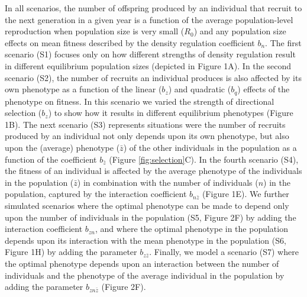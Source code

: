 \documentclass{article}
\begin{document}
 In all scenarios, the number of offspring produced by an individual that recruit to the next generation in a given year is a function of the average population-level reproduction when population size is very small ($R_0$) and any population size effects on mean fitness described by the density regulation coefficient $b_{n}$. The first scenario (S1) focuses only on how different strengths of density regulation result in different equilibrium population sizes (depicted in Figure 1A). In the second scenario (S2), the number of recruits an individual produces is also affected by its own phenotype as a function of the linear ($b_z$) and quadratic ($b_q$) effects of the phenotype on fitness. In this scenario we varied the strength of directional selection ($b_z$) to show how it results in different equilibrium phenotypes (Figure 1B). The next scenario (S3) represents situations were the number of recruits produced by an individual not only depends upon its own phenotype, but also upon the (average) phenotype ($\bar{z}$) of the other individuals in the population as a function of the coefficient $b_{\bar{z}}$ (Figure \ref{fig:selection}C). In the fourth scenario (S4), the fitness of an individual is affected by the average phenotype of the individuals in the population ($\bar{z}$) in combination with the number of individuals ($n$) in the population,  captured by the interaction coefficient $b_{n\bar{z}}$ (Figure 1E). We further simulated scenarios where the optimal phenotype can be made to depend only upon the number of individuals in the population (S5, Figure 2F) by adding the interaction coefficient $b_{zn}$, and where the optimal phenotype in the population depends upon its interaction with the mean phenotype in the population (S6, Figure 1H) by adding the parameter $b_{z\bar{z}}$. Finally, we model a scenario (S7) where the optimal phenotype depends upon an interaction between the number of individuals and the phenotype of the average individual in the population by adding the parameter $b_{zn\bar{z}}$ (Figure 2F).
 
\end{document}
